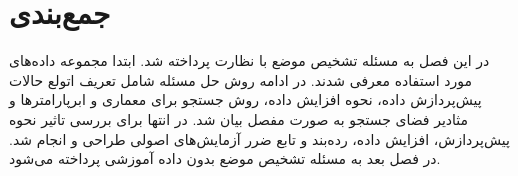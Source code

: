\section{جمع‌بندی}
در این فصل به مسئله تشخیص موضع با نظارت پرداخته شد. ابتدا مجموعه داده‌های مورد استفاده معرفی شدند. در ادامه روش حل مسئله شامل تعریف اتولع حالات پیش‌پردازش داده، نحوه افزایش داده، روش جستجو برای معماری و ابرپارامترها و مثادیر فضای جستجو به صورت مفصل بیان شد. در انتها برای بررسی تاثیر نحوه پیش‌پردازش، افزایش داده، رده‌بند و تابع ضرر آزمایش‌های اصولی طراحی و انجام شد. در فصل بعد به مسئله تشخیص موضع بدون داده آموزشی پرداخته می‌شود.

